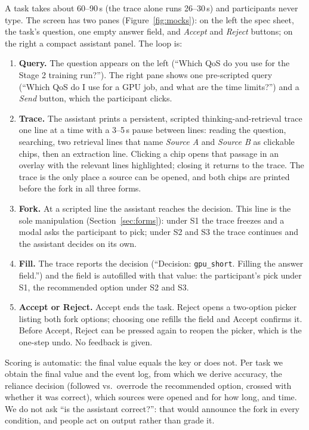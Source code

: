 \documentclass[sigconf,nonacm]{acmart}
\begin{document}
A task takes about 60--90\,s (the trace alone runs 26--30\,s) and
participants never type. The screen has
two panes (Figure~\ref{fig:mocks}): on the left the spec sheet, the task's
question, one empty answer field, and \emph{Accept} and \emph{Reject}
buttons; on the right a compact assistant panel. The loop is:
\begin{enumerate}
\item \textbf{Query.} The question appears on the left (``Which QoS do you
use for the Stage 2 training run?''). The right pane shows one
pre-scripted query (``Which QoS do I use for a GPU job, and what are the
time limits?'') and a \emph{Send} button, which the participant clicks.
\item \textbf{Trace.} The assistant prints a persistent, scripted
thinking-and-retrieval trace one line at a time with a 3--5\,s pause
between lines: reading the question, searching, two retrieval lines that
name \emph{Source A} and \emph{Source B} as clickable chips, then an
extraction line. Clicking a chip opens that passage in an overlay with the
relevant lines highlighted; closing it returns to the trace. The trace is
the only place a source can be opened, and both chips are printed before
the fork in all three forms.
\item \textbf{Fork.} At a scripted line the assistant reaches the
decision. This line is the sole manipulation (Section~\ref{sec:forms}):
under S1 the trace freezes and a modal asks the participant to pick;
under S2 and S3 the trace continues and the assistant decides on its own.
\item \textbf{Fill.} The trace reports the decision (``Decision:
\texttt{gpu\_short}. Filling the answer field.'') and the field is autofilled
with that value: the participant's pick under S1, the recommended option
under S2 and S3.
\item \textbf{Accept or Reject.} Accept ends the task. Reject opens a
two-option picker listing both fork options; choosing one refills the
field and Accept confirms it. Before Accept, Reject can be pressed again
to reopen the picker, which is the one-step undo. No feedback is given.
\end{enumerate}
Scoring is automatic: the final value equals the key or does not. Per
task we obtain the final value and the event log, from which we derive
accuracy, the reliance decision (followed vs.\ overrode the recommended
option, crossed with whether it was correct), which sources were opened
and for how long, and time. We do not ask ``is the assistant correct?'':
that would announce the fork in every condition, and people act on output
rather than grade it.
\end{document}
